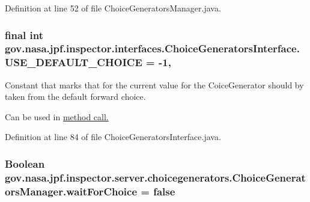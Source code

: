Definition at line 52 of file Choice\+Generators\+Manager.\+java.

\subsubsection[{\texorpdfstring{U\+S\+E\+\_\+\+D\+E\+F\+A\+U\+L\+T\+\_\+\+C\+H\+O\+I\+CE}{USE_DEFAULT_CHOICE}}]{\setlength{\rightskip}{0pt plus 5cm}final int gov.\+nasa.\+jpf.\+inspector.\+interfaces.\+Choice\+Generators\+Interface.\+U\+S\+E\+\_\+\+D\+E\+F\+A\+U\+L\+T\+\_\+\+C\+H\+O\+I\+CE = -\/1\hspace{0.3cm}{\ttfamily [static]}, {\ttfamily [inherited]}}\hypertarget{interfacegov_1_1nasa_1_1jpf_1_1inspector_1_1interfaces_1_1_choice_generators_interface_ac57a2bb0eb101be2c2b27bd19cb81ea7}{}\label{interfacegov_1_1nasa_1_1jpf_1_1inspector_1_1interfaces_1_1_choice_generators_interface_ac57a2bb0eb101be2c2b27bd19cb81ea7}


Constant that marks that for the current value for the Coice\+Generator should by taken from the default forward choice. 

Can be used in \hyperlink{interfacegov_1_1nasa_1_1jpf_1_1inspector_1_1interfaces_1_1_choice_generators_interface_a055b8d48f863633614dee147bc607ed7}{method call. }

Definition at line 84 of file Choice\+Generators\+Interface.\+java.

\subsubsection[{\texorpdfstring{wait\+For\+Choice}{waitForChoice}}]{\setlength{\rightskip}{0pt plus 5cm}Boolean gov.\+nasa.\+jpf.\+inspector.\+server.\+choicegenerators.\+Choice\+Generators\+Manager.\+wait\+For\+Choice = false\hspace{0.3cm}{\ttfamily [private]}}\hypertarget{classgov_1_1nasa_1_1jpf_1_1inspector_1_1server_1_1choicegenerators_1_1_choice_generators_manager_a1ef08cad611a7c5476c5e64f2b6d9224}{}\label{classgov_1_1nasa_1_1jpf_1_1inspector_1_1server_1_1choicegenerators_1_1_choice_generators_manager_a1ef08cad611a7c5476c5e64f2b6d9224}


